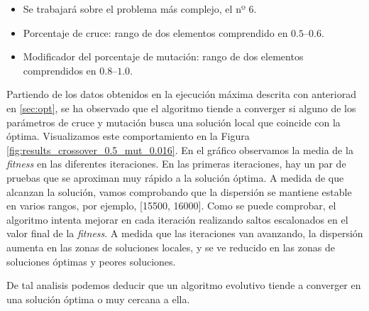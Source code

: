 \documentclass[runningheads]{llncs}
\begin{document}
\begin{itemize}
	\item Se trabajará sobre el problema más complejo, el nº 6.
	\item Porcentaje de cruce: rango de dos elementos comprendido en $\numrange[range-phrase = --]{0.5}{0.6}$.
	\item Modificador del porcentaje de mutación: rango de dos elementos comprendidos en $\numrange[range-phrase = --]{0.8}{1.0}$.
\end{itemize}

Partiendo de los datos obtenidos en la ejecución máxima descrita con anteriorad en \ref{sec:opt}, se ha observado que el algoritmo tiende a converger
si alguno de los parámetros de cruce y mutación busca una solución local que coincide con la óptima. Visualizamos este comportamiento en la Figura \ref{fig:results_crossover_0.5_mut_0.016}.
En el gráfico observamos la media de la \textit{fitness} en las diferentes iteraciones. En las primeras iteraciones, hay un par de pruebas que 
se aproximan muy rápido a la solución óptima. A medida de que alcanzan la solución, vamos comprobando que la dispersión se mantiene estable en varios rangos, por ejemplo,
[15500, 16000]. Como se puede comprobar, el algoritmo intenta mejorar en cada iteración realizando saltos escalonados en el valor final de la \textit{fitness}.
A medida que las iteraciones van avanzando, la dispersión aumenta en las zonas de soluciones locales, y se ve reducido en las zonas de soluciones óptimas y peores soluciones.

De tal analisis podemos deducir que un algoritmo evolutivo tiende a converger en una solución óptima o muy cercana a ella.

\end{document}
